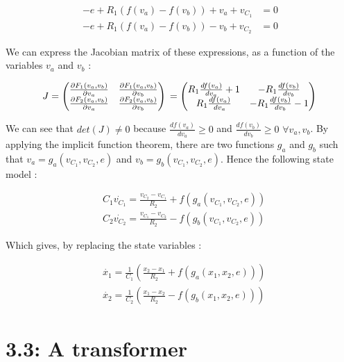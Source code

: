\begin{align}
-e + R_1\left(f(v_a)-f(v_b)\right) + v_a + v_{C_1} & = 0\\
-e + R_1\left(f(v_a)-f(v_b)\right) - v_b + v_{C_2} & = 0
\end{align}

We can express the Jacobian matrix of these expressions, as a function of the variables $v_a$ and $v_b$ :

\begin{equation}
J=
\begin{pmatrix}
\frac{\partial F_1(v_a,v_b)}{\partial v_a} & \frac{\partial F_1(v_a,v_b)}{\partial v_b} \\
\frac{\partial F_2(v_a,v_b)}{\partial v_a} & \frac{\partial F_2(v_a,v_b)}{\partial v_b} \\
\end{pmatrix}\\
=\begin{pmatrix}
R_1 \frac{df(v_a)}{dv_a}+1 & -R_1 \frac{df(v_b)}{dv_b} \\
R_1 \frac{df(v_a)}{dv_a} & -R_1 \frac{df(v_b)}{dv_b}-1 \\
\end{pmatrix}\\
\end{equation}

We can see that $det(J) \neq 0$ because $\frac{df(v_a)}{dv_a} \geq 0$ and $\frac{df(v_b)}{dv_b} \geq 0$ $\forall v_a, v_b$. By applying the implicit function theorem, there are two functions $g_a$ and $g_b$ such that $v_a=g_a(v_{C_1},v_{C_2},e)$ and $v_b=g_b(v_{C_1},v_{C_2},e)$. Hence the following state model :

\begin{align}
&C_1\dot{v_{C_1}} = \frac{v_{C_2}-v_{C_1}}{R_2}+f(g_a(v_{C_1},v_{C_2},e))\\
&C_2\dot{v_{C_2}} = \frac{v_{C_1}-v_{C_2}}{R_2}-f(g_b(v_{C_1},v_{C_2},e))
\end{align}

Which gives, by replacing the state variables :

\begin{align}
&\dot{x_1} = \frac{1}{C_1} \left( \frac{x_2-x_1}{R_2}+f(g_a(x_1,x_2,e)) \right)\\
&\dot{x_2} = \frac{1}{C_2} \left( \frac{x_1-x_2}{R_2}-f(g_b(x_1,x_2,e)) \right)
\end{align}

\newpage

\section*{3.3: A transformer}

